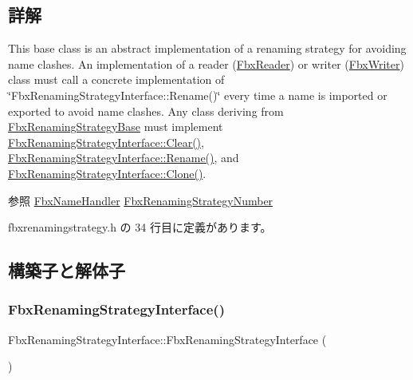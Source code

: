 \subsection{詳解}
This base class is an abstract implementation of a renaming strategy for avoiding name clashes. An implementation of a reader (\hyperlink{class_fbx_reader}{Fbx\+Reader}) or writer (\hyperlink{class_fbx_writer}{Fbx\+Writer}) class must call a concrete implementation of \char`\"{}\+Fbx\+Renaming\+Strategy\+Interface\+::\+Rename()\char`\"{} every time a name is imported or exported to avoid name clashes. Any class deriving from \hyperlink{class_fbx_renaming_strategy_base}{Fbx\+Renaming\+Strategy\+Base} must implement \hyperlink{class_fbx_renaming_strategy_interface_a2090b5ae43936b617ec5d75015923f69}{Fbx\+Renaming\+Strategy\+Interface\+::\+Clear()}, \hyperlink{class_fbx_renaming_strategy_interface_a1b91016c68dd9c7031624026fd39638a}{Fbx\+Renaming\+Strategy\+Interface\+::\+Rename()}, and \hyperlink{class_fbx_renaming_strategy_interface_ab394ed8a9b5d3ec40334bc933af83907}{Fbx\+Renaming\+Strategy\+Interface\+::\+Clone()}.

\begin{DoxySeeAlso}{参照}
\hyperlink{class_fbx_name_handler}{Fbx\+Name\+Handler} \hyperlink{class_fbx_renaming_strategy_number}{Fbx\+Renaming\+Strategy\+Number} 
\end{DoxySeeAlso}


 fbxrenamingstrategy.\+h の 34 行目に定義があります。



\subsection{構築子と解体子}
\mbox{\label{class_fbx_renaming_strategy_interface_a4c211fabbf906c3e3102a17febe1a428}} 
\subsubsection{\texorpdfstring{Fbx\+Renaming\+Strategy\+Interface()}{FbxRenamingStrategyInterface()}}
{\footnotesize\ttfamily Fbx\+Renaming\+Strategy\+Interface\+::\+Fbx\+Renaming\+Strategy\+Interface (\begin{DoxyParamCaption}{ }\end{DoxyParamCaption})}




